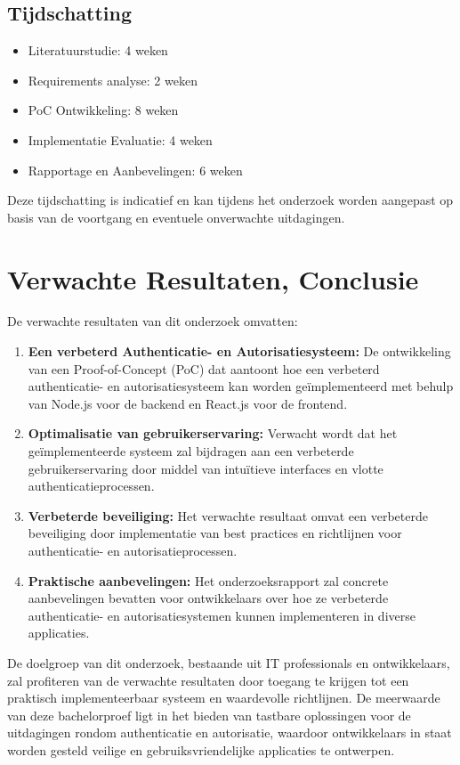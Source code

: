 \subsection{Tijdschatting}

\begin{itemize}
\item Literatuurstudie: 4 weken
\item Requirements analyse: 2 weken
\item PoC Ontwikkeling: 8 weken
\item Implementatie Evaluatie: 4 weken
\item Rapportage en Aanbevelingen: 6 weken
\end{itemize}

Deze tijdschatting is indicatief en kan tijdens het onderzoek worden aangepast op basis van de voortgang en eventuele onverwachte uitdagingen.

\section{Verwachte Resultaten, Conclusie}%
\label{sec:verwachte_resultaten}

De verwachte resultaten van dit onderzoek omvatten:

\begin{enumerate}
    \item \textbf{Een verbeterd Authenticatie- en Autorisatiesysteem:} 
    De ontwikkeling van een Proof-of-Concept (PoC) dat aantoont hoe een verbeterd authenticatie- en autorisatiesysteem kan worden geïmplementeerd met 
    behulp van Node.js voor de backend en React.js voor de frontend.

    \item \textbf{Optimalisatie van gebruikerservaring:} 
    Verwacht wordt dat het geïmplementeerde systeem zal bijdragen aan een verbeterde gebruikerservaring door middel van intuïtieve interfaces en 
    vlotte authenticatieprocessen.

    \item \textbf{Verbeterde beveiliging:} 
    Het verwachte resultaat omvat een verbeterde beveiliging door implementatie van best practices en richtlijnen voor authenticatie- en 
    autorisatieprocessen.

    \item \textbf{Praktische aanbevelingen:}
    Het onderzoeksrapport zal concrete aanbevelingen bevatten voor ontwikkelaars over hoe ze verbeterde authenticatie- en autorisatiesystemen kunnen 
    implementeren in diverse applicaties.
\end{enumerate}

De doelgroep van dit onderzoek, bestaande uit IT professionals en ontwikkelaars, zal profiteren van de verwachte resultaten door toegang te krijgen 
tot een praktisch implementeerbaar systeem en waardevolle richtlijnen. De meerwaarde van deze bachelorproef ligt in het bieden van tastbare 
oplossingen voor de uitdagingen rondom authenticatie en autorisatie, waardoor ontwikkelaars in staat worden gesteld veilige en gebruiksvriendelijke 
applicaties te ontwerpen.

